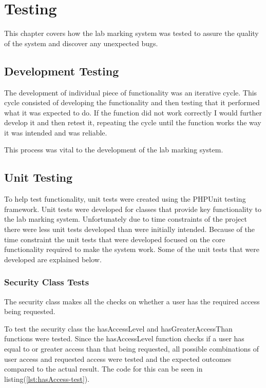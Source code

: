 \documentclass[11pt]{report}
\begin{document}
\newpage
\chapter{Testing}

This chapter covers how the lab marking system was tested to assure the quality of the system and discover any unexpected bugs.


\section{Development Testing}

The development of individual piece of functionality was an iterative cycle. This cycle consisted of developing the functionality and then testing that it performed what it was expected to do. If the function did not work correctly I would further develop it and then retest it, repeating the cycle until the function works the way it was intended and was reliable.  

This process was vital to the development of the lab marking system. 


\section{Unit Testing}
To help test functionality, unit tests were created using the PHPUnit testing framework. Unit tests were developed for classes that provide key functionality to the lab marking system. Unfortunately due to time constraints of the project there were less unit tests developed than were initially intended. Because of the time constraint the unit tests that were developed focused on the core functionality required to make the system work. Some of the unit tests that were developed are explained below.

\subsection{Security Class Tests}

The security class makes all the checks on whether a user has the required access being requested. 

To test the security class  the hasAccessLevel and hasGreaterAccessThan functions were tested. Since the hasAccessLevel function checks if a user has equal to or greater access than that being requested, all possible combinations of user access and requested access were tested and the expected outcomes compared to the actual result. The code for this can be seen in listing(\ref{lst:hasAccess-test}).
\end{document}
